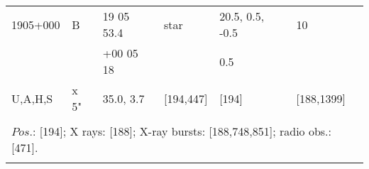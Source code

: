 \documentclass{aa}
\begin{document}
\begin{tabular}{p{2.5cm}p{1cm}p{1.8cm}p{2.3cm}p{3.3cm}p{2.0cm}p{2.2cm}}
\noalign{\smallskip}
1905+000           & B                 & 19 05 53.4           & star                    & 20.5, 0.5, -0.5       & 10                    &       \\
                             &                     & +00 05 18             &                            & 0.5                         &                          &      \\
U,A,H,S              & x 5"             & 35.0, 3.7                & [194,447]          & [194]                     & [188,1399]      &   \\
\\ 
\multicolumn{7}{p{17.5cm}}{
$Pos$.: [194]; X rays: [188]; X-ray bursts: [188,748,851]; radio obs.: [471].}\\
\noalign{\smallskip}
\hline

\end{tabular}
\end{document}
